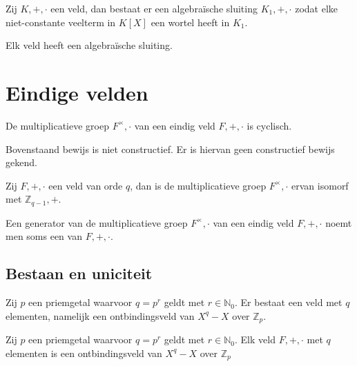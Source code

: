\documentclass[main.tex]{subfiles}
\begin{document}
\begin{lem}
  Zij $K,+,\cdot$ een veld, dan bestaat er een algebra\"ische sluiting $K_{1},+,\cdot$ zodat elke niet-constante veelterm in $K[X]$ een wortel heeft in $K_{1}$.
\end{lem}

\begin{st}
  Elk veld heeft een algebra\"ische sluiting.
\end{st}

\section{Eindige velden}
\label{sec:eindige-velden}

\begin{st}
  De multiplicatieve groep $F^{\times},\cdot$ van een eindig veld $F,+,\cdot$ is cyclisch.
\end{st}

\begin{opm}
  Bovenstaand bewijs is niet constructief.
  Er is hiervan geen constructief bewijs gekend.
\end{opm}

\begin{gev}
  Zij $F,+,\cdot$ een veld van orde $q$, dan is de multiplicatieve groep $F^{\times},\cdot$ ervan isomorf met $\mathbb{Z}_{q-1},+$.
\end{gev}

\begin{de}
  Een generator van de multiplicatieve groep $F^{\times},\cdot$ van een eindig veld $F,+,\cdot$ noemt men soms een  van $F,+,\cdot$.
\end{de}

\subsection{Bestaan en uniciteit}
\label{sec:bestaan-en-uniciteit}

\begin{st}
  Zij $p$ een priemgetal waarvoor $q=p^{r}$ geldt met $r\in \mathbb{N}_{0}$.
  Er bestaat een veld met $q$ elementen, namelijk een ontbindingsveld van $X^{q}-X$ over $\mathbb{Z}_{p}$.
\end{st}

\begin{st}
  Zij $p$ een priemgetal waarvoor $q=p^{r}$ geldt met $r\in \mathbb{N}_{0}$.
  Elk veld $F,+,\cdot$ met $q$ elementen is een ontbindingsveld van $X^{q}-X$ over $\mathbb{Z}_p$
\end{st}
\end{document}
